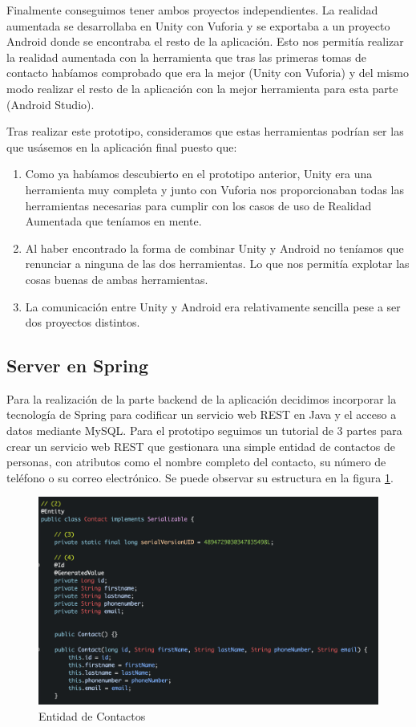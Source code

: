 Finalmente conseguimos tener ambos proyectos independientes. La realidad aumentada se desarrollaba en Unity con Vuforia y se exportaba a un proyecto Android donde se encontraba el resto de la aplicación.
Esto nos permitía realizar la realidad aumentada con la herramienta que tras las primeras tomas de contacto habíamos comprobado que era la mejor (Unity con Vuforia) y del mismo modo realizar el resto de la aplicación con la mejor herramienta para esta parte (Android Studio).

Tras realizar este prototipo, consideramos que estas herramientas podrían ser las que usásemos en la aplicación final puesto que:
\begin{enumerate}
    \item Como ya habíamos descubierto en el prototipo anterior, Unity era una herramienta muy completa y junto con Vuforia nos proporcionaban todas las herramientas necesarias para cumplir con los casos de uso de Realidad Aumentada que teníamos en mente.
    \item Al haber encontrado la forma de combinar Unity y Android no teníamos que renunciar a ninguna de las dos herramientas. Lo que nos permitía explotar las cosas buenas de ambas herramientas.
    \item La comunicación entre Unity y Android era relativamente sencilla pese a ser dos proyectos distintos.
\end{enumerate}


\subsection{Server en Spring} 
\label{makereference4.1.6}

Para la realización de la parte backend de la aplicación decidimos
incorporar la tecnología de Spring para codificar un servicio web REST en Java
y el acceso a datos mediante MySQL. Para el prototipo seguimos un tutorial\cite{tutorialspring} de 3 partes para crear un servicio web REST
que gestionara una simple entidad de contactos de personas, con atributos como el nombre completo del contacto, su número de teléfono o su correo electrónico. Se puede observar su estructura
en la figura \ref{fig:entidadContactos}.
    \begin{figure}[H]
        \centering
        \includegraphics[width=6in]{figures/ContactsEntity.png}
        \caption{Entidad de Contactos}
        \label{fig:entidadContactos}
    \end{figure}

